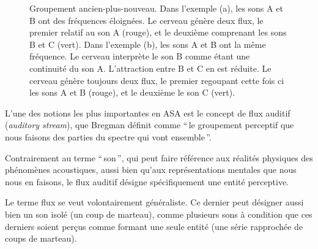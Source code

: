 \begin{figure}[bth]
        \myfloatalign
        \caption[Groupement ancien-plus-nouveau]{Groupement ancien-plus-nouveau. Dans l'exemple (a), les sons A et B ont des fréquences éloignées. Le cerveau génère deux flux, le premier relatif au son A (rouge), et le deuxième comprenant les sons B et C (vert). Dans l'exemple (b), les sons A et B ont la même fréquence. Le cerveau interprète le son B comme étant une continuité du son A. L'attraction entre B et C en est réduite. Le cerveau génère toujours deux flux, le premier regoupant cette fois ci les sons A et B (rouge), et le deuxième le son C (vert).}\label{fig:oldplusnew}
\end{figure}

L'une des notions les plus importantes en ASA est le concept de flux auditif (\emph{auditory stream}), que Bregman définit comme ``\,le groupement perceptif que nous faisons des parties du spectre qui vont ensemble\,''.

Contrairement au terme ``\,son\,'', qui peut faire référence aux réalités physiques des phénomènes acoustiques, aussi bien qu'aux représentations mentales que nous nous en faisons, le flux auditif désigne spécifiquement une entité perceptive.

Le terme flux se veut volontairement généraliste. Ce dernier peut désigner aussi bien un son isolé (un coup de marteau), comme plusieurs sons à condition que ces derniers soient perçus comme formant une seule entité (une série rapprochée de coups de marteau).

